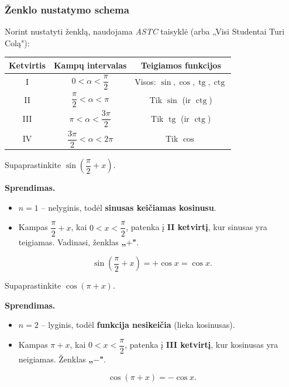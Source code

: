 \subsubsection*{Ženklo nustatymo schema}

Norint nustatyti ženklą, naudojama \emph{ASTC} taisyklė (arba „Visi Studentai
Turi Colą"):

\begin{center}
\begin{tabular}{|c|c|c|}
  \hline
  \textbf{Ketvirtis} & \textbf{Kampų intervalas} & \textbf{Teigiamos funkcijos} \\
  \hline
  I   & $0 < \alpha < \dfrac{\pi}{2}$        & Visos: $\sin,\cos,\operatorname{tg},\operatorname{ctg}$ \\
  \hline
  II  & $\dfrac{\pi}{2} < \alpha < \pi$      & Tik $\sin$ (ir $\operatorname{ctg}$) \\
  \hline
  III & $\pi < \alpha < \dfrac{3\pi}{2}$     & Tik $\operatorname{tg}$ (ir $\operatorname{ctg}$) \\
  \hline
  IV  & $\dfrac{3\pi}{2} < \alpha < 2\pi$    & Tik $\cos$ \\
  \hline
\end{tabular}
\end{center}

\begin{example}
  Supaprastinkite $\sin\!\left(\dfrac{\pi}{2} + x\right)$.

  \textbf{Sprendimas.}
  \begin{itemize}
    \item $n = 1$ -- nelyginis, todėl \textbf{sinusas keičiamas kosinusu}.
    \item Kampas $\dfrac{\pi}{2} + x$, kai $0<x<\dfrac{\pi}{2}$, patenka į
          \textbf{II ketvirtį}, kur sinusas yra teigiamas. Vadinasi,
          ženklas \textbf{„$+$"}.
  \end{itemize}
  \[
    \sin\!\left(\frac{\pi}{2}+x\right) = +\cos x = \cos x.
  \]
\end{example}

\begin{example}
  Supaprastinkite $\cos\!\left(\pi + x\right)$.

  \textbf{Sprendimas.}
  \begin{itemize}
    \item $n = 2$ -- lyginis, todėl \textbf{funkcija nesikeičia} (lieka kosinusas).
    \item Kampas $\pi + x$, kai $0<x<\dfrac{\pi}{2}$, patenka į
          \textbf{III ketvirtį}, kur kosinusas yra neigiamas. Ženklas \textbf{„$-$"}.
  \end{itemize}
  \[
    \cos(\pi + x) = -\cos x.
  \]
\end{example}

